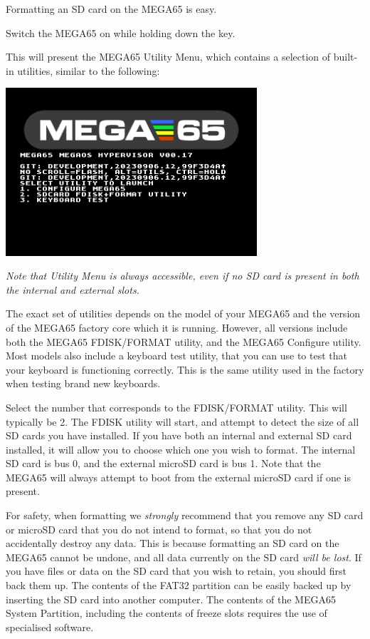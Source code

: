 Formatting an SD card on the MEGA65 is easy.

Switch the MEGA65 on while holding down the  key.

This will present the MEGA65 Utility Menu, which contains a
selection of built-in utilities, similar to the following:

\begin{center}
\includegraphics[width=0.7\textwidth]{images/ss-utilmenu.png}
\end{center}

{\em Note that Utility Menu is always accessible, even if no SD card is present in both the internal and external slots.}

The exact set of utilities
depends on the model of your MEGA65 and the version of the MEGA65
factory core which it is running. However, all versions include both
the MEGA65 FDISK/FORMAT utility, and the MEGA65 Configure utility.
Most models also include a keyboard test utility, that you can use
to test that your keyboard is functioning correctly.  This is
the same utility used in the factory when testing brand
new keyboards.

Select the number that corresponds to the FDISK/FORMAT utility.  This
will typically be 2.  The FDISK utility will start, and attempt to
detect the size of all SD cards you have installed.  If you have both
an internal and external SD card installed, it will allow you to
choose which one you wish to format. The internal SD card is bus 0,
and the external microSD card is bus 1. Note that the MEGA65 will
always attempt to boot from the external microSD card if one is
present.

For safety, when formatting we {\em strongly} recommend
that you remove any SD card or microSD card that you do not intend to
format, so that you do not accidentally destroy any data.  This is
because formatting an SD card on the MEGA65 cannot be undone, and
all data currently on the SD card {\em will be lost}.  If you
have files or data on the SD card that you wish to retain, you
should first back them up.  The contents of the FAT32
partition can be easily backed up by inserting the SD card into
another computer.  The contents of the MEGA65 System Partition,
including the contents of freeze slots requires the use of specialised
software.

